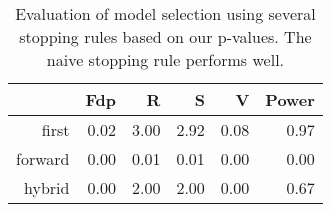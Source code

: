 \begin{table}[ht]
\centering
\begin{tabular}{rrrrrr}
  \hline
 & Fdp & R & S & V & Power \\ 
  \hline
first & 0.02 & 3.00 & 2.92 & 0.08 & 0.97 \\ 
  forward & 0.00 & 0.01 & 0.01 & 0.00 & 0.00 \\ 
  hybrid & 0.00 & 2.00 & 2.00 & 0.00 & 0.67 \\ 
   \hline
\end{tabular}
\caption{Evaluation of model selection using several stopping rules based on our p-values. The naive stopping rule performs well.} 
\end{table}

